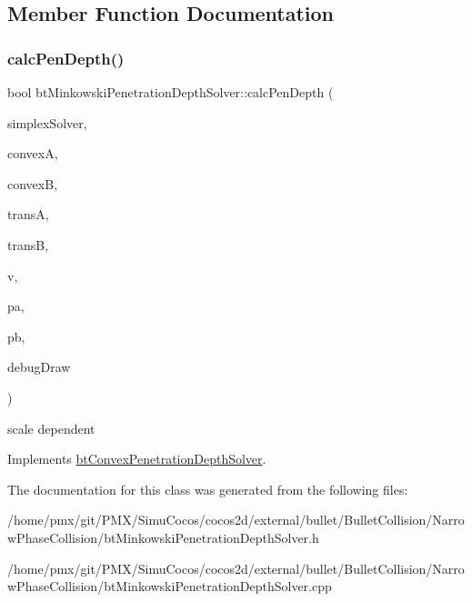 \subsection{Member Function Documentation}
\mbox{\label{classbtMinkowskiPenetrationDepthSolver_ada75e93337af3d895f0f33f3140361c7}} 
\subsubsection{\texorpdfstring{calc\+Pen\+Depth()}{calcPenDepth()}}
{\footnotesize\ttfamily bool bt\+Minkowski\+Penetration\+Depth\+Solver\+::calc\+Pen\+Depth (\begin{DoxyParamCaption}\item[{bt\+Simplex\+Solver\+Interface \&}]{simplex\+Solver,  }\item[{const bt\+Convex\+Shape $\ast$}]{convexA,  }\item[{const bt\+Convex\+Shape $\ast$}]{convexB,  }\item[{const bt\+Transform \&}]{transA,  }\item[{const bt\+Transform \&}]{transB,  }\item[{bt\+Vector3 \&}]{v,  }\item[{bt\+Vector3 \&}]{pa,  }\item[{bt\+Vector3 \&}]{pb,  }\item[{class \hyperlink{classbtIDebugDraw}{bt\+I\+Debug\+Draw} $\ast$}]{debug\+Draw }\end{DoxyParamCaption})\hspace{0.3cm}{\ttfamily [virtual]}}

scale dependent 

Implements \hyperlink{classbtConvexPenetrationDepthSolver}{bt\+Convex\+Penetration\+Depth\+Solver}.



The documentation for this class was generated from the following files\+:\begin{DoxyCompactItemize}
\item 
/home/pmx/git/\+P\+M\+X/\+Simu\+Cocos/cocos2d/external/bullet/\+Bullet\+Collision/\+Narrow\+Phase\+Collision/bt\+Minkowski\+Penetration\+Depth\+Solver.\+h\item 
/home/pmx/git/\+P\+M\+X/\+Simu\+Cocos/cocos2d/external/bullet/\+Bullet\+Collision/\+Narrow\+Phase\+Collision/bt\+Minkowski\+Penetration\+Depth\+Solver.\+cpp\end{DoxyCompactItemize}
